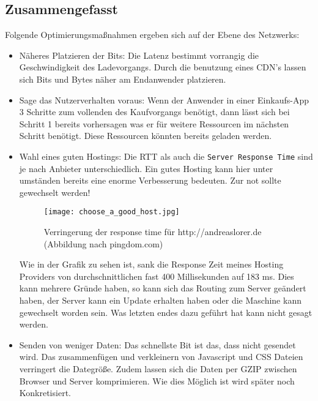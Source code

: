 
	\subsection{Zusammengefasst} %
	\label{sub:zusammengefasst}
		Folgende Optimierungsmaßnahmen ergeben sich auf der Ebene des Netzwerks:
		\begin{itemize}
			\item Näheres Platzieren der Bits: Die Latenz bestimmt vorrangig die Geschwindigkeit des Ladevorgangs. Durch die benutzung eines CDN's lassen sich Bits und Bytes näher am Endanwender platzieren.
			\item Sage das Nutzerverhalten voraus: Wenn der Anwender in einer Einkaufs-App 3 Schritte zum vollenden des Kaufvorgangs benötigt, dann lässt sich bei Schritt 1 bereits vorhersagen was er für weitere Ressourcen im nächsten Schritt benötigt. Diese Ressourcen könnten bereits geladen werden.
			\item Wahl eines guten Hostings: Die RTT als auch die \texttt{Server Response Time} sind je nach Anbieter unterschiedlich. Ein gutes Hosting kann hier unter umständen bereits eine enorme Verbesserung bedeuten. Zur not sollte gewechselt werden!

			\begin{figure}[htbp]
				\begin{center}
					\texttt{[image: choose\_a\_good\_host.jpg]}
					\caption{Verringerung der response time für http://andreaslorer.de (Abbildung nach pingdom.com)}
					\label{fig:choose_a_good_host}
				\end{center}
			\end{figure}
			
			Wie in der Grafik zu sehen ist, sank die Response Zeit meines Hosting Providers von durchschnittlichen fast 400 Millisekunden auf 183 ms. Dies kann mehrere Gründe haben, so kann sich das Routing zum Server geändert haben, der Server kann ein Update erhalten haben oder die Maschine kann gewechselt worden sein. Was letzten endes dazu geführt hat kann nicht gesagt werden.

			\item Senden von weniger Daten: Das schnellste Bit ist das, dass nicht gesendet wird. Das zusammenfügen und verkleinern von Javascript und CSS Dateien verringert die Dategröße. Zudem lassen sich die Daten per GZIP zwischen Browser und Server komprimieren. Wie dies Möglich ist wird später noch Konkretisiert.


\end{itemize}
